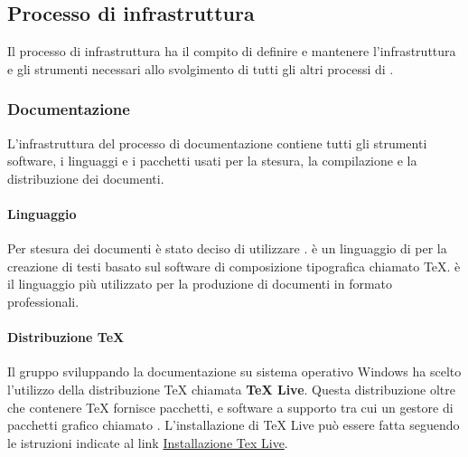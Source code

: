 \subsection{Processo di infrastruttura}
\label{subsec:proc_infrastruttura}
Il processo di infrastruttura ha il compito di definire e mantenere l'infrastruttura e gli strumenti necessari allo svolgimento di tutti gli altri processi di .

\subsubsection{Documentazione}
L'infrastruttura del processo di documentazione contiene tutti gli strumenti software, i linguaggi e i pacchetti usati per la stesura, la compilazione e la distribuzione dei documenti.

\paragraph{Linguaggio}
\label{par:latex}
Per stesura dei documenti è stato deciso di utilizzare .
 è un linguaggio di  per la creazione di testi basato sul software di composizione tipografica chiamato TeX.
 è il linguaggio più utilizzato per la produzione di documenti in formato  professionali.


\paragraph{Distribuzione TeX}
Il gruppo sviluppando la documentazione su sistema operativo Windows ha scelto l'utilizzo della distribuzione TeX chiamata \textbf{TeX Live}.
Questa distribuzione oltre che contenere TeX fornisce pacchetti,  e software a supporto tra cui un gestore di pacchetti grafico chiamato \textbf{}.
L'installazione di TeX Live può essere fatta seguendo le istruzioni indicate al link \href{https://www.tug.org/texlive/windows.html}{Installazione Tex Live}.

